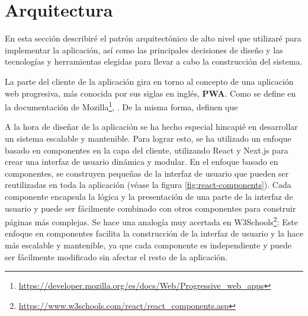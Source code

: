 
\section{Arquitectura}\label{sec:arquitectura}

En esta sección describiré el patrón arquitectónico de alto nivel que utilizaré para implementar la aplicación, así como las principales decisiones de diseño y las tecnologías y herramientas elegidas para llevar a cabo la construcción del sistema.

La parte del cliente de la aplicación gira en torno al concepto de una aplicación web progresiva, más conocida por sus siglas en inglés, \textbf{PWA}. Como se define en la documentación de Mozilla\footnote{\url{https://developer.mozilla.org/es/docs/Web/Progressive_web_apps}}, . De la misma forma, definen que 

A la hora de diseñar de la aplicación se ha hecho especial hincapié en desarrollar un sistema escalable y mantenible. Para lograr esto, se ha utilizado un enfoque basado en componentes en la capa del cliente, utilizando React y Next.js para crear una interfaz de usuario dinámica y modular. En el enfoque basado en componentes, se construyen pequeñas  de la interfaz de usuario que pueden ser reutilizadas en toda la aplicación (véase la figura \ref{fig:react-components}). Cada componente encapsula la lógica y la presentación de una parte de la interfaz de usuario y puede ser fácilmente combinado con otros componentes para construir páginas más complejas. Se hace una analogía muy acertada en W3Schools\footnote{\url{https://www.w3schools.com/react/react_components.asp}}:  Este enfoque en componentes facilita la construcción de la interfaz de usuario y la hace más escalable y mantenible, ya que cada componente es independiente y puede ser fácilmente modificado sin afectar el resto de la aplicación.


